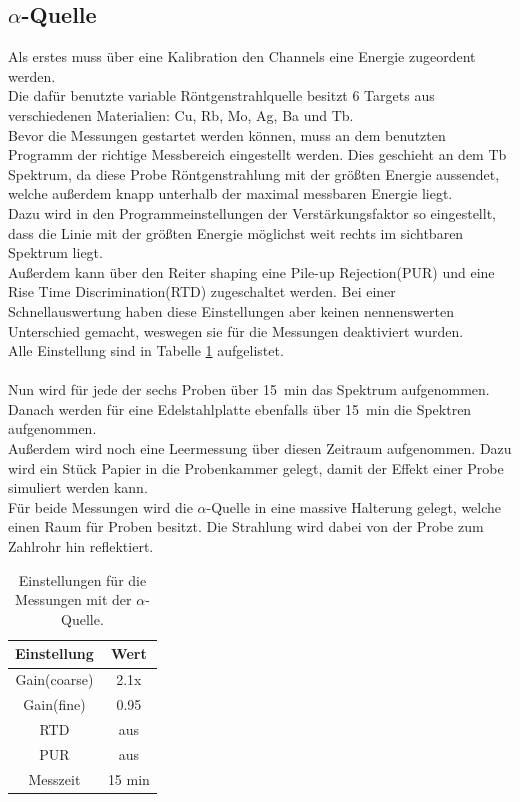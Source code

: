\documentclass[12pt,a4paper]{article}
\begin{document}
\subsection{$\alpha$-Quelle}
Als erstes muss über eine Kalibration den Channels eine Energie zugeordent werden.\\
Die dafür benutzte variable Röntgenstrahlquelle besitzt 6 Targets aus verschiedenen Materialien: Cu, Rb, Mo, Ag, Ba und Tb.\\
Bevor die Messungen gestartet werden können, muss an dem benutzten Programm der richtige Messbereich eingestellt werden. Dies geschieht an dem Tb Spektrum, da diese Probe Röntgenstrahlung mit der größten Energie aussendet, welche außerdem knapp unterhalb der maximal messbaren Energie liegt.\\
Dazu wird in den Programmeinstellungen der Verstärkungsfaktor so eingestellt, dass die Linie mit der größten Energie möglichst weit rechts im sichtbaren Spektrum liegt.\\
Außerdem kann über den Reiter shaping eine Pile-up Rejection(PUR) und eine Rise Time Discrimination(RTD) zugeschaltet werden. Bei einer Schnellauswertung haben diese Einstellungen aber keinen nennenswerten Unterschied gemacht, weswegen sie für die Messungen deaktiviert wurden.\\
Alle Einstellung sind in Tabelle \ref{tab:alpha_Einstellungen} aufgelistet.\\
\\
Nun wird für jede der sechs Proben über \SI{15}{min} das Spektrum aufgenommen.\\
Danach werden für eine Edelstahlplatte ebenfalls über \SI{15}{min} die Spektren aufgenommen.\\
Außerdem wird noch eine Leermessung über diesen Zeitraum aufgenommen. Dazu wird ein Stück Papier in die Probenkammer gelegt, damit der Effekt einer Probe simuliert werden kann.\\
Für beide Messungen wird die $\alpha$-Quelle in eine massive Halterung gelegt, welche einen Raum für Proben besitzt. Die Strahlung wird dabei von der Probe zum Zahlrohr hin reflektiert.
\begin{table}
\centering
\begin{tabular}{|c|c|}
\hline 
Einstellung & Wert \\ 
\hline 
Gain(coarse) & 2.1x \\ 
\hline 
Gain(fine) & 0.95 \\ 
\hline 
RTD & aus \\ 
\hline 
PUR & aus \\ 
\hline 
Messzeit & 15 min \\ 
\hline 
\end{tabular} 
\caption{Einstellungen für die Messungen mit der $\alpha$-Quelle.}
\label{tab:alpha_Einstellungen}
\end{table}
\end{document}
